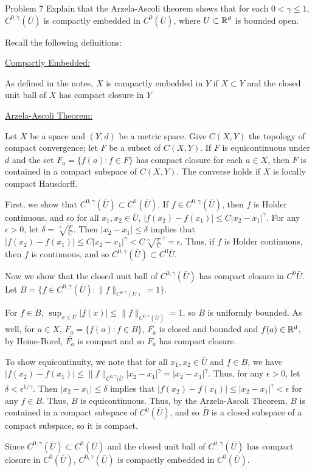 \documentclass{hmwk}
\begin{document}
\begin{problem}{Problem 7}
Explain that the Arzela-Ascoli theorem shows that for each $0 < \gamma \leq 1$, $C^{0, \gamma}(\bar{U})$ is compactly embedded in $C^0(\bar{U})$, where $U \subset \mathbb{R}^d$ is bounded open. 
\end{problem}

\begin{solution}

\pre Recall the following definitions:

\pre \underline{Compactly Embedded:}

\pre As defined in the notes, $X$ is compactly embedded in $Y$ if $X \subset Y$ and the closed unit ball of $X$ has compact closure in $Y$

\pre \underline{Arzela-Ascoli Theorem:}

\pre Let $X$ be a space and $(Y, d)$ be a metric space. Give $C(X, Y)$ the topology of compact convergence; let $F$ be a subset of $C(X, Y)$. If $F$ is equicontinuous under $d$ and the set $F_a = \{f(a) : f \in F\}$ has compact closure for each $a \in X$, then $F$ is contained in a compact subspace of $C(X, Y)$. The converse holds if $X$ is locally compact Hausdorff. 

\pre First, we show that $C^{0, \gamma}(\bar{U}) \subset C^0(\bar{U})$. If $f \in C^{0, \gamma}(\bar{U})$, then $f$ is Holder continuous, and so for all $x_1, x_2 \in \bar{U}$, $|f(x_2) - f(x_1)| \leq C|x_2 - x_1|^\gamma$. For any $\epsilon > 0$, let $\delta = \sqrt[\gamma]{\frac{\epsilon}{C}}$. Then $|x_2 - x_1| \leq \delta$  implies that $|f(x_2) - f(x_1)| \leq C|x_2 - x_1|^\gamma < C\sqrt[\gamma]{\frac{\epsilon}{C}}^\gamma = \epsilon$. Thus, if $f$ is Holder continuous, then $f$ is continuous, and so $C^{0, \gamma}(\bar{U}) \subset C^0{\bar{U}}$.

\pre Now we show that the closed unit ball of $C^{0, \gamma}(\bar{U})$ has compact closure in $C^0{\bar{U}}$. Let $B = \{f \in C^{0, \gamma}(\bar{U}) : \|f\|_{C^{0, \gamma}(U)} = 1\}$. 

\pre For $f \in B$, $\sup_{x \in \bar{U}} |f(x)| \leq \|f\|_{C^{0, \gamma}(\bar{U})} = 1$, so $B$ is uniformly bounded. As well, for $a \in X$, $F_a = \{f(a) : f \in B\}$, $\bar{F_a}$ is closed and bounded and $f(a) \in \mathbb{R}^d$, by Heine-Borel, $\bar{F_a}$ is compact and so $F_a$ has compact closure. 

\pre To show equicontinuity, we note that for all $x_1, x_2 \in \bar{U}$ and $f \in B$, we have $|f(x_2) - f(x_1)| \leq \|f\|_{C^{0, \gamma}(\bar{U}}|x_2 - x_1|^\gamma = |x_2 - x_1|^\gamma$. Thus, for any $\epsilon > 0$, let $\delta < \epsilon^{1/\gamma}$. Then $|x_2 - x_1| \leq \delta$ implies that $|f(x_2) - f(x_1)| \leq |x_2 - x_1|^\gamma < \epsilon$ for any $f \in B$. Thus, $B$ is equicontinuous. Thus, by the Arzela-Ascoli Theorem, $B$ is contained in a compact subspace of $C^0(\bar{U})$, and so $\bar{B}$ is a closed subspace of a compact subspace, so it is compact. 

\pre Since $C^{0, \gamma}(\bar{U}) \subset C^0(\bar{U})$ and the closed unit ball of $C^{0, \gamma}(\bar{U})$ has compact closure in $C^0(\bar{U})$, $C^{0, \gamma}(\bar{U})$ is compactly embedded in $C^0(\bar{U})$.
\end{solution}
\end{document}
